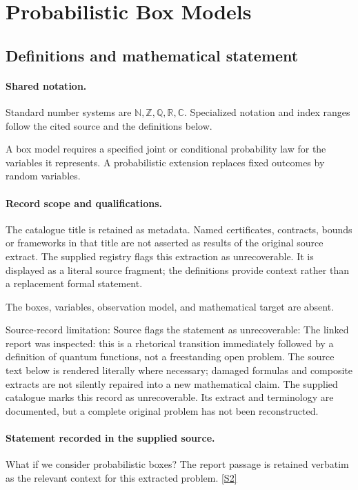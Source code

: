 \documentclass[11pt]{article}
\newcommand{\sref}[2]{\hyperlink{source:#1:#2}{[S#2]}}
\begin{document}
\section{Probabilistic Box Models}\label{statement}

\subsection{Definitions and mathematical statement}

\paragraph{Shared notation.}Standard number systems are $\mathbb N,\mathbb Z,\mathbb Q,\mathbb R,\mathbb C$. Specialized notation and index ranges follow the cited source and the definitions below.


A box model requires a specified joint or conditional probability law for the variables it represents. A probabilistic extension replaces fixed outcomes by random variables.
\paragraph{Record scope and qualifications.}
The catalogue title is retained as metadata. Named certificates, contracts, bounds or frameworks in that title are not asserted as results of the original source extract.
The supplied registry flags this extraction as unrecoverable. It is displayed as a literal source fragment; the definitions provide context rather than a replacement formal statement.

The boxes, variables, observation model, and mathematical target are absent.

Source-record limitation: Source flags the statement as unrecoverable: The linked report was inspected: this is a rhetorical transition immediately followed by a definition of quantum functions, not a freestanding open problem.
The source text below is rendered literally where necessary; damaged formulas and composite extracts are not silently repaired into a new mathematical claim.
The supplied catalogue marks this record as unrecoverable. Its extract and terminology are documented, but a complete original problem has not been reconstructed.
\paragraph{Statement recorded in the supplied source.}
What if we consider probabilistic boxes? The report passage is retained verbatim as the relevant context for this extracted problem. \sref{statement}{2}
\end{document}
